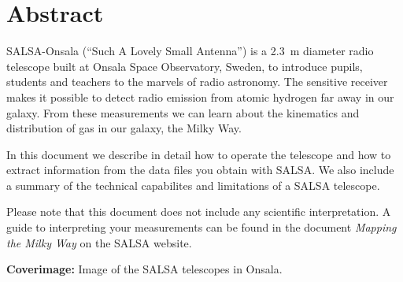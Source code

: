 \chapter*{Abstract}
SALSA-Onsala (``Such A Lovely Small Antenna'') is a 2.3~m diameter radio
telescope built at Onsala Space Observatory, Sweden, to introduce pupils,
students and teachers to the marvels of radio astronomy.  The sensitive
receiver makes it possible to detect radio emission from atomic hydrogen far
away in our galaxy. From these measurements we can learn about the kinematics
and distribution of gas in our galaxy, the Milky Way.

In this document we describe in detail how to operate the telescope
and how to extract information from the data files you obtain with SALSA.
We also include a summary of the technical capabilites and limitations
of a SALSA telescope.

Please note that this document does not include any scientific interpretation.
A guide to interpreting your measurements can be found in the document 
\emph{Mapping the Milky Way} on the SALSA website.

\vspace{9cm}




{\bf Coverimage:} Image of the SALSA telescopes in Onsala.
